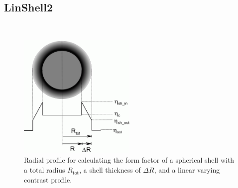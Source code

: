 \clearpage
\subsection{LinShell2}
\label{sect:LinShell2} ~\\

\begin{figure}[htb]
\begin{center}
\includegraphics[width=0.5\textwidth,height=0.533\textwidth]{../images/form_factor/spheres/linshell2.png}
\end{center}
\caption{Radial profile for calculating the form factor of a spherical shell with a total
radius $R_\text{tot}$, a shell thickness of $\Delta R$, and a linear varying contrast
profile.} \label{LinShell2Profile}
\end{figure}

